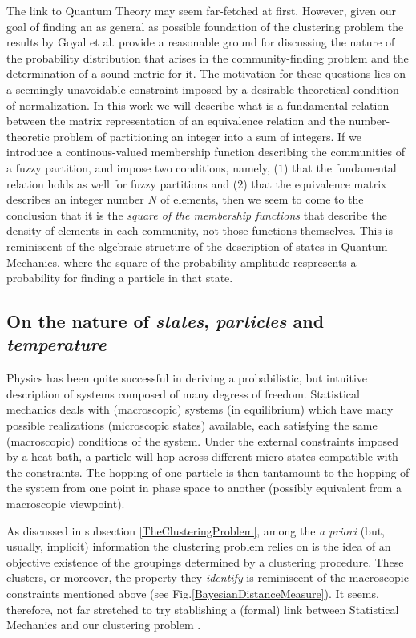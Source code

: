 \documentclass[twocolumn,aps,sort,nofootinbib]{revtex4}
\begin{document}
The link to Quantum Theory may seem far-fetched at first.
However, given 
our goal of finding an as general as possible 
foundation of the clustering problem
the results by Goyal et al. \cite{Goyal11,Goyal10} 
provide a reasonable ground for discussing the nature of
the probability distribution that arises in the community-finding problem
and the determination of a sound metric for it.
The motivation for these questions lies on 
a seemingly unavoidable constraint imposed by
a desirable theoretical condition of normalization.
In this work we will describe what is a fundamental
relation between the matrix representation of an 
equivalence relation and the number-theoretic problem
of partitioning an integer into a sum of integers.  
If we introduce a continous-valued membership function describing
the communities of a fuzzy partition,   
and impose two conditions, namely, 
($1$) that the fundamental relation holds as well for fuzzy partitions 
and 
($2$) that the equivalence matrix describes an
integer number $N$ of elements, 
then we seem to come to the conclusion that it is
the {\sl square of the membership functions} that
describe the density of elements in each community,
not those functions themselves. This is 
reminiscent of the algebraic structure of
the description of states in Quantum Mechanics,
where the square of the probability amplitude
respresents a probability for finding a particle
in that state.  
\subsection{On the nature of {\sl states}, {\sl particles} and {\sl temperature}}
Physics has been quite successful in deriving a probabilistic,
but intuitive description of systems composed of many degress of freedom.
Statistical mechanics deals with (macroscopic) systems (in equilibrium)
which have many possible realizations (microscopic states) available, each
satisfying the same (macroscopic) conditions of the system. 
Under the external constraints
imposed by a heat bath, a particle will hop across different
micro-states compatible with the constraints.
The hopping of one particle is then tantamount to the hopping
of the system from one point in phase space to another 
(possibly equivalent from a macroscopic viewpoint). 

As discussed in subsection \ref{TheClusteringProblem}, 
among the {\sl a priori} (but, usually, implicit) information
the clustering problem relies on 
is the idea of an objective existence of the groupings determined
by a clustering procedure. These clusters, or moreover, the property
they {\sl identify} is reminiscent of the macroscopic
constraints mentioned above (see Fig.\ref{BayesianDistanceMeasure}).
It seems, therefore, not far stretched to try stablishing a (formal) link
between Statistical Mechanics and 
our clustering problem \cite{Jaynes55,Jaynes57,Reichardt06}.
\end{document}

